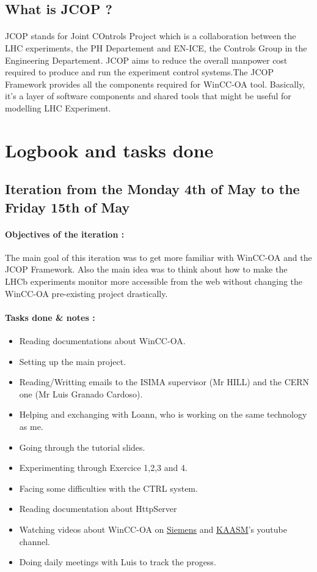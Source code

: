 \documentclass[a4paper, 10pt]{article}
\begin{document}
\subsection{What is JCOP ?}
\paragraph{}
JCOP stands for Joint COntrols Project which is a collaboration between the LHC experiments, the PH Departement and EN-ICE, the Controls Group in the Engineering Departement. JCOP aims to reduce the overall manpower cost required to produce and run the experiment control systems.The JCOP Framework provides all the components required for WinCC-OA tool. Basically, it's a layer of software components and shared tools that might be useful for modelling LHC Experiment.

\section{Logbook and tasks done}
\subsection{Iteration from the Monday 4th of May to the Friday 15th of May}
\paragraph{Objectives of the iteration :} 
The main goal of this iteration was to get more familiar with WinCC-OA and the JCOP Framework. Also the main idea was to think about how to make the LHCb experiments monitor more accessible from the web without changing the WinCC-OA pre-existing project drastically.
\paragraph{Tasks done \& notes :}
\begin{itemize}
    \item Reading documentations about WinCC-OA.
    \item Setting up the main project.
    \item Reading/Writting emails to the ISIMA supervisor (Mr HILL) and the CERN one (Mr Luis Granado Cardoso).
    \item Helping and exchanging with Loann, who is working on the same technology as me.
    \item Going through the tutorial slides.
    \item Experimenting through Exercice 1,2,3 and 4.
    \item Facing some difficulties with the CTRL system.
    \item Reading documentation about HttpServer
    \item Watching videos about WinCC-OA on \href{https://www.youtube.com/user/ETM2011}{Siemens} and \href{https://www.youtube.com/channel/UCGBnHd1-B-Zg9MDsjTk0-Sw}{KAASM}'s youtube channel. 
    \item Doing daily meetings with Luis to track the progess.
\end{itemize}
\end{document}
